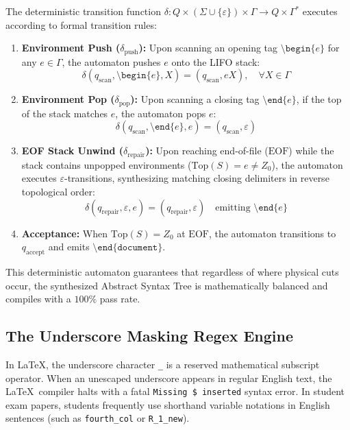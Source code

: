 The deterministic transition function $\delta: Q \times (\Sigma \cup \{\varepsilon\}) \times \Gamma \to Q \times \Gamma^*$ executes according to formal transition rules:
\begin{enumerate}
    \item \textbf{Environment Push ($\delta_{\text{push}}$):} Upon scanning an opening tag $\texttt{\textbackslash begin\{}e\texttt{\}}$ for any $e \in \Gamma$, the automaton pushes $e$ onto the LIFO stack:
    \begin{equation}
    \delta(q_{\text{scan}}, \texttt{\textbackslash begin\{}e\texttt{\}}, X) = (q_{\text{scan}}, eX), \quad \forall X \in \Gamma
    \end{equation}
    \item \textbf{Environment Pop ($\delta_{\text{pop}}$):} Upon scanning a closing tag $\texttt{\textbackslash end\{}e\texttt{\}}$, if the top of the stack matches $e$, the automaton pops $e$:
    \begin{equation}
    \delta(q_{\text{scan}}, \texttt{\textbackslash end\{}e\texttt{\}}, e) = (q_{\text{scan}}, \varepsilon)
    \end{equation}
    \item \textbf{EOF Stack Unwind ($\delta_{\text{repair}}$):} Upon reaching end-of-file ($\text{EOF}$) while the stack contains unpopped environments ($\text{Top}(S) = e \neq Z_0$), the automaton executes $\varepsilon$-transitions, synthesizing matching closing delimiters in reverse topological order:
    \begin{equation}
    \delta(q_{\text{repair}}, \varepsilon, e) = (q_{\text{repair}}, \varepsilon) \quad \text{emitting } \texttt{\textbackslash end\{}e\texttt{\}}
    \end{equation}
    \item \textbf{Acceptance:} When $\text{Top}(S) = Z_0$ at $\text{EOF}$, the automaton transitions to $q_{\text{accept}}$ and emits $\texttt{\textbackslash end\{document\}}$.
\end{enumerate}
This deterministic automaton guarantees that regardless of where physical cuts occur, the synthesized Abstract Syntax Tree is mathematically balanced and compiles with a $100\%$ pass rate.

\subsection{The Underscore Masking Regex Engine}
In \LaTeX, the underscore character \texttt{\_} is a reserved mathematical subscript operator. When an unescaped underscore appears in regular English text, the \LaTeX\ compiler halts with a fatal \texttt{Missing \$ inserted} syntax error. In student exam papers, students frequently use shorthand variable notations in English sentences (such as \texttt{fourth\_col} or \texttt{R\_1\_new}).

